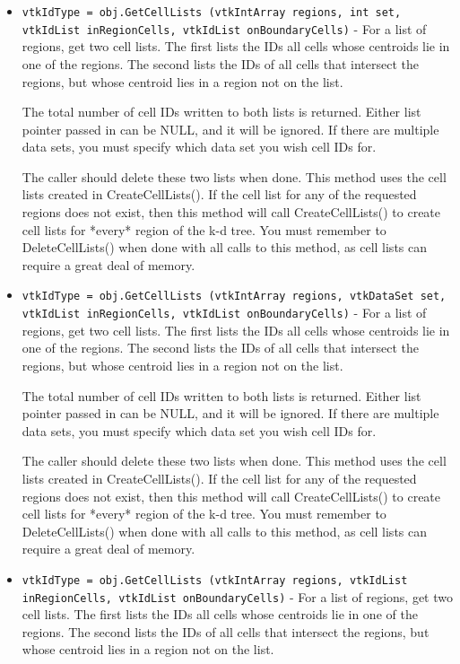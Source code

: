 \begin{itemize}
\item  \verb|vtkIdType = obj.GetCellLists (vtkIntArray regions, int set, vtkIdList inRegionCells, vtkIdList onBoundaryCells)| -    
   For a list of regions, get two cell lists.  The first lists
   the IDs  all cells whose centroids lie in one of the regions.
   The second lists the IDs of all cells that intersect the regions,
   but whose centroid lies in a region not on the list.

   The total number of cell IDs written to both lists is returned.
   Either list pointer passed in can be NULL, and it will be ignored.
   If there are multiple data sets, you must specify which data set
   you wish cell IDs for.

   The caller should delete these two lists when done.  This method
   uses the cell lists created in CreateCellLists().
   If the cell list for any of the requested regions does not
   exist, then this method will call CreateCellLists() to create
   cell lists for *every* region of the k-d tree.  You must remember 
   to DeleteCellLists() when done with all calls to this method, as 
   cell lists can require a great deal of memory.

\item  \verb|vtkIdType = obj.GetCellLists (vtkIntArray regions, vtkDataSet set, vtkIdList inRegionCells, vtkIdList onBoundaryCells)| -    
   For a list of regions, get two cell lists.  The first lists
   the IDs  all cells whose centroids lie in one of the regions.
   The second lists the IDs of all cells that intersect the regions,
   but whose centroid lies in a region not on the list.

   The total number of cell IDs written to both lists is returned.
   Either list pointer passed in can be NULL, and it will be ignored.
   If there are multiple data sets, you must specify which data set
   you wish cell IDs for.

   The caller should delete these two lists when done.  This method
   uses the cell lists created in CreateCellLists().
   If the cell list for any of the requested regions does not
   exist, then this method will call CreateCellLists() to create
   cell lists for *every* region of the k-d tree.  You must remember 
   to DeleteCellLists() when done with all calls to this method, as 
   cell lists can require a great deal of memory.

\item  \verb|vtkIdType = obj.GetCellLists (vtkIntArray regions, vtkIdList inRegionCells, vtkIdList onBoundaryCells)| -    
   For a list of regions, get two cell lists.  The first lists
   the IDs  all cells whose centroids lie in one of the regions.
   The second lists the IDs of all cells that intersect the regions,
   but whose centroid lies in a region not on the list.


\end{itemize}
